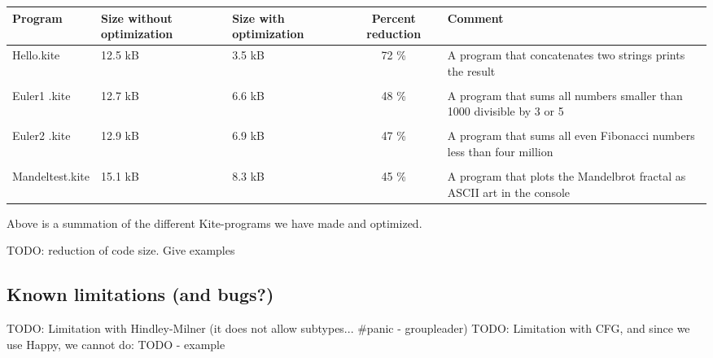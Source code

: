 \begin{center}
  \begin{tabulary}{0.9\textwidth}{|L| L |L| C | L | }
    \hline
    Program & Size without optimization & Size with optimization & Percent reduction & Comment \\
    \hline
    Hello.kite       & 12.5 kB & 3.5 kB & 72 \% & A program that concatenates two strings prints the result \\
    & & & & \\
    Euler1 .kite       & 12.7 kB & 6.6 kB & 48 \% & A program that sums all numbers smaller than 1000 divisible by 3 or 5 \\
    & & & & \\
    Euler2 .kite       & 12.9 kB & 6.9 kB & 47 \% & A program that sums all even Fibonacci numbers less than four million \\
    & & & & \\
    Mandeltest.kite       & 15.1 kB & 8.3 kB & 45 \% & A program that plots the Mandelbrot fractal as ASCII art in the console\\
    \hline
  \end{tabulary}  
\end{center}

Above is a summation of the different Kite-programs we have made and optimized.



TODO: reduction of code size. Give examples
\subsection{Known limitations (and bugs?)}
TODO: Limitation with Hindley-Milner (it does not allow subtypes... \#panic - groupleader)
TODO: Limitation with CFG, and since we use Happy, we cannot do: TODO - example
